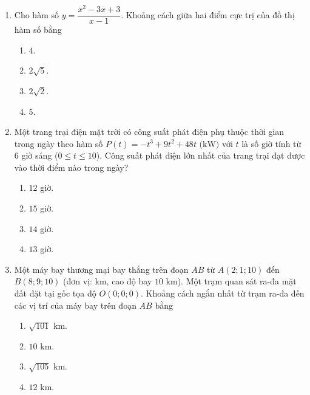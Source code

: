 \documentclass[12pt,a4paper]{article}
\begin{document}
\begin{enumerate}[label=\textbf{Câu \arabic*:}, leftmargin=*]
\item
\begin{minipage}[t]{\linewidth} 
Cho hàm số $y = \dfrac{x^2 - 3x + 3}{x - 1}$. Khoảng cách giữa hai điểm cực trị của đồ thị hàm số bằng
\begin{enumerate}[label=\Alph*., itemsep=0pt, topsep=3pt, parsep=0pt]
    \item $4$.
    \item $2\sqrt{5}$.
    \item $2\sqrt{2}$.
    \item $5$.
\end{enumerate}
\end{minipage}

\item
\begin{minipage}[t]{\linewidth} 
Một trang trại điện mặt trời có công suất phát điện phụ thuộc thời gian trong ngày theo hàm số $P(t) = -t^3 + 9t^2 + 48t\text{ (kW)}$ với $t$ là số giờ tính từ 6 giờ sáng ($0 \le t \le 10$). Công suất phát điện lớn nhất của trang trại đạt được vào thời điểm nào trong ngày?
\begin{enumerate}[label=\Alph*., itemsep=0pt, topsep=3pt, parsep=0pt]
    \item $12$ giờ.
    \item $15$ giờ.
    \item $14$ giờ.
    \item $13$ giờ.
\end{enumerate}
\end{minipage}

\item
\begin{minipage}[t]{\linewidth} 
Một máy bay thương mại bay thẳng trên đoạn $AB$ từ $A(2; 1; 10)$ đến $B(8; 9; 10)$ (đơn vị: km, cao độ bay $10\text{ km}$). Một trạm quan sát ra-đa mặt đất đặt tại gốc tọa độ $O(0; 0; 0)$. Khoảng cách ngắn nhất từ trạm ra-đa đến các vị trí của máy bay trên đoạn $AB$ bằng
\begin{enumerate}[label=\Alph*., itemsep=0pt, topsep=3pt, parsep=0pt]
    \item $\sqrt{101}\text{ km}$.
    \item $10\text{ km}$.
    \item $\sqrt{105}\text{ km}$.
    \item $12\text{ km}$.
\end{enumerate}
\end{minipage}


\end{enumerate}
\end{document}
